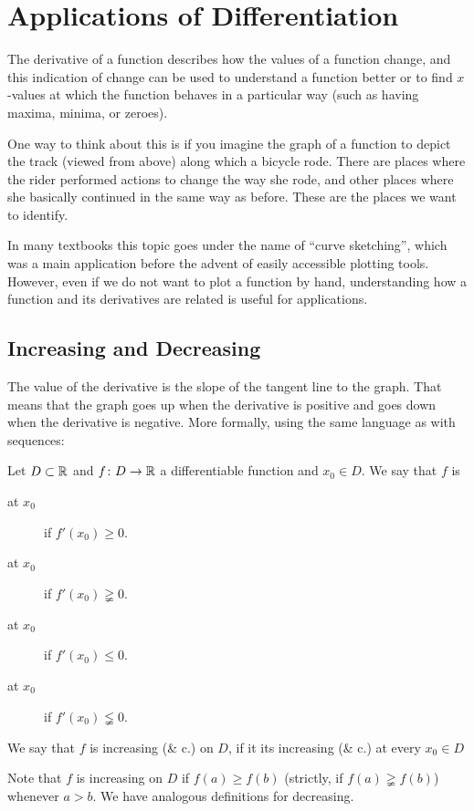 \chapter{Applications of Differentiation}
\label{chappdiff}

The derivative of a function describes how the values of a function change,
and this indication of change can be used to understand a function better or
to find $x$-values at which the function behaves in a particular way (such
as having maxima, minima, or zeroes).

One way to think about this is if you imagine the graph of a function to
depict the track (viewed from above) along which a bicycle rode.
There are places where the rider performed actions to change the way she
rode, and other places where she basically continued in the same way as
before. These are the places we want to identify.

In many textbooks this topic goes under the name of ``curve sketching'',
which was a main application before the advent of easily accessible plotting
tools. However, even if we do not want to plot a function by hand,
understanding how a function and its derivatives are related is useful for
applications.

\section{Increasing and Decreasing}
\label{secincr}

The value of the derivative is the slope of the tangent line to the graph.
That means that the graph goes up
when the derivative is positive and goes down
when the derivative is negative. More formally, using the same language as
with sequences:
\begin{defn}
Let $D\subset{\mathbb R}$ and $f\colon D\to{\mathbb R}$ a differentiable function and $x_0\in
D$. We say that $f$ is
\begin{description}
\item[ at $x_0$] if $f'(x_0)\ge 0$.
\item[ at $x_0$] if $f'(x_0)\gneqq 0$.
\item[ at $x_0$] if $f'(x_0)\le 0$.
\item[ at $x_0$] if $f'(x_0)\lneqq 0$.
\end{description}
We say that $f$ is increasing (\& c.) on $D$, if it its increasing
(\& c.) at every $x_0\in D$
\end{defn}
Note that $f$ is increasing on $D$ if $f(a)\ge f(b)$ (strictly, if
$f(a)\gneqq f(b)$) whenever $a>b$. We have analogous definitions for
decreasing.

